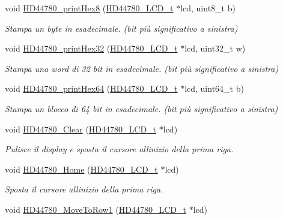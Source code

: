 \begin{DoxyCompactItemize}
void \hyperlink{group___h_d44780_gad967bd458b4d2bd358a93cbb7144addd}{H\+D44780\+\_\+print\+Hex8} (\hyperlink{struct_h_d44780___l_c_d__t}{H\+D44780\+\_\+\+L\+C\+D\+\_\+t} $\ast$lcd, uint8\+\_\+t b)
\begin{DoxyCompactList}\small\item\em Stampa un byte in esadecimale. (bit più significativo a sinistra) \end{DoxyCompactList}\item 
void \hyperlink{group___h_d44780_gaa82a2a27a3008f55c969a2d390c50497}{H\+D44780\+\_\+print\+Hex32} (\hyperlink{struct_h_d44780___l_c_d__t}{H\+D44780\+\_\+\+L\+C\+D\+\_\+t} $\ast$lcd, uint32\+\_\+t w)
\begin{DoxyCompactList}\small\item\em Stampa una word di 32 bit in esadecimale. (bit più significativo a sinistra) \end{DoxyCompactList}\item 
void \hyperlink{group___h_d44780_ga7a4b110e7da806f8c01e01d184d3a19a}{H\+D44780\+\_\+print\+Hex64} (\hyperlink{struct_h_d44780___l_c_d__t}{H\+D44780\+\_\+\+L\+C\+D\+\_\+t} $\ast$lcd, uint64\+\_\+t b)
\begin{DoxyCompactList}\small\item\em Stampa un blocco di 64 bit in esadecimale. (bit più significativo a sinistra) \end{DoxyCompactList}\item 
void \hyperlink{group___h_d44780_ga38cac13d7a66f068be54f79a716ff7d4}{H\+D44780\+\_\+\+Clear} (\hyperlink{struct_h_d44780___l_c_d__t}{H\+D44780\+\_\+\+L\+C\+D\+\_\+t} $\ast$lcd)
\begin{DoxyCompactList}\small\item\em Pulisce il display e sposta il cursore all\textquotesingle{}inizio della prima riga. \end{DoxyCompactList}\item 
void \hyperlink{group___h_d44780_ga68e3712332aa9482d4bdaa4991a92127}{H\+D44780\+\_\+\+Home} (\hyperlink{struct_h_d44780___l_c_d__t}{H\+D44780\+\_\+\+L\+C\+D\+\_\+t} $\ast$lcd)
\begin{DoxyCompactList}\small\item\em Sposta il cursore all\textquotesingle{}inizio della prima riga. \end{DoxyCompactList}\item 
void \hyperlink{group___h_d44780_gad90e2924a4e632ce42940323f8f49e37}{H\+D44780\+\_\+\+Move\+To\+Row1} (\hyperlink{struct_h_d44780___l_c_d__t}{H\+D44780\+\_\+\+L\+C\+D\+\_\+t} $\ast$lcd)

\end{DoxyCompactItemize}
